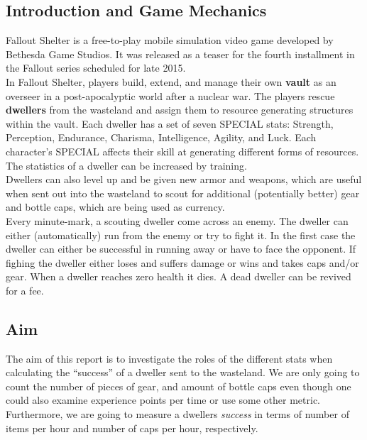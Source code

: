 \subsection{Introduction and Game Mechanics}
Fallout Shelter is a free-to-play mobile simulation video game developed by Bethesda Game Studios. It was released as a teaser for the fourth installment in the Fallout series scheduled for late 2015.\\

In Fallout Shelter, players build, extend, and manage their own \textbf{vault} as an overseer in a post-apocalyptic world after a nuclear war. The players rescue \textbf{dwellers} from the wasteland and assign them to resource generating structures within the vault. Each dweller has a set of seven SPECIAL stats: Strength, Perception, Endurance, Charisma, Intelligence, Agility, and Luck. Each character's SPECIAL affects their skill at generating different forms of resources. The statistics of a dweller can be increased by training.\\

Dwellers can also level up and be given new armor and weapons, which are useful when sent out into the wasteland to scout for additional (potentially better) gear and bottle caps, which are being used as currency.\\

Every minute-mark, a scouting dweller come across an enemy. The dweller can either (automatically) run from the enemy or try to fight it. In the first case the dweller can either be successful in running away or have to face the opponent. If fighing the dweller either loses and suffers damage or wins and takes caps and/or gear. When a dweller reaches zero health it dies. A dead dweller can be revived for a fee.\\

\subsection{Aim}
The aim of this report is to investigate the roles of the different stats when calculating the ``success'' of a dweller sent to the wasteland. We are only going to count the number of pieces of gear, and amount of bottle caps even though one could also examine experience points per time or use some other metric. Furthermore, we are going to measure a dwellers \textit{success} in terms of number of items per hour and number of caps per hour, respectively.\\

